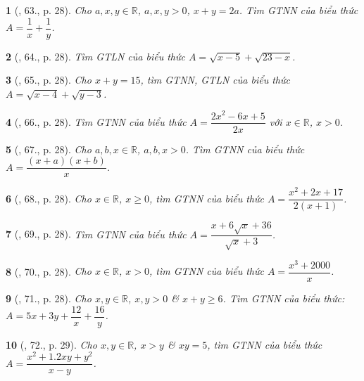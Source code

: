 \documentclass{article}
\newtheorem{baitoan}{}
\begin{document}
\begin{baitoan}[\cite{Tuyen_Toan_9}, 63., p. 28]
	Cho $a,x,y\in\mathbb{R}$, $a,x,y > 0$, $x + y = 2a$. Tìm {\rm GTNN} của biểu thức $A = \dfrac{1}{x} + \dfrac{1}{y}$.
\end{baitoan}

\begin{baitoan}[\cite{Tuyen_Toan_9}, 64., p. 28]
	Tìm {\rm GTLN} của biểu thức $A = \sqrt{x - 5} + \sqrt{23 - x}$.
\end{baitoan}

\begin{baitoan}[\cite{Tuyen_Toan_9}, 65., p. 28]
	Cho $x + y = 15$, tìm {\rm GTNN}, {\rm GTLN} của biểu thức $A = \sqrt{x - 4} + \sqrt{y - 3}$.
\end{baitoan}

\begin{baitoan}[\cite{Tuyen_Toan_9}, 66., p. 28]
	Tìm {\rm GTNN} của biểu thức $A = \dfrac{2x^2 - 6x + 5}{2x}$ với $x\in\mathbb{R}$, $x > 0$.
\end{baitoan}

\begin{baitoan}[\cite{Tuyen_Toan_9}, 67., p. 28]
	Cho $a,b,x\in\mathbb{R}$, $a,b,x > 0$. Tìm {\rm GTNN} của biểu thức $A = \dfrac{(x + a)(x + b)}{x}$.
\end{baitoan}

\begin{baitoan}[\cite{Tuyen_Toan_9}, 68., p. 28]
	Cho $x\in\mathbb{R}$, $x\ge0$, tìm {\rm GTNN} của biểu thức $A = \dfrac{x^2 + 2x + 17}{2(x + 1)}$.
\end{baitoan}

\begin{baitoan}[\cite{Tuyen_Toan_9}, 69., p. 28]
	Tìm {\rm GTNN} của biểu thức $A = \dfrac{x + 6\sqrt{x} + 36}{\sqrt{x} + 3}$.
\end{baitoan}

\begin{baitoan}[\cite{Tuyen_Toan_9}, 70., p. 28]
	Cho $x\in\mathbb{R}$, $x > 0$, tìm {\rm GTNN} của biểu thức $A = \dfrac{x^3 + 2000}{x}$.
\end{baitoan}

\begin{baitoan}[\cite{Tuyen_Toan_9}, 71., p. 28]
	Cho $x,y\in\mathbb{R}$, $x,y > 0$ \& $x + y\ge6$. Tìm {\rm GTNN} của biểu thức: $A = 5x + 3y + \dfrac{12}{x} + \dfrac{16}{y}$.
\end{baitoan}

\begin{baitoan}[\cite{Tuyen_Toan_9}, 72., p. 29]
	Cho $x,y\in\mathbb{R}$, $x > y$ \& $xy = 5$, tìm {\rm GTNN} của biểu thức $A = \dfrac{x^2 + 1.2xy + y^2}{x - y}$.
\end{baitoan}
\end{document}
